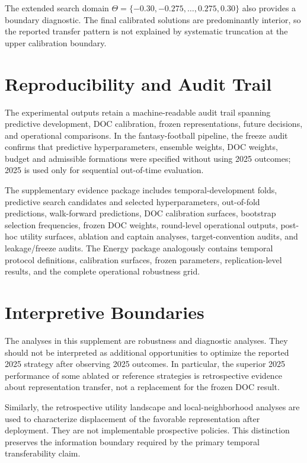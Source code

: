\documentclass[a4paper,fleqn]{cas-sc}
\begin{document}
The extended search domain
$\Theta=\{-0.30,-0.275,\ldots,0.275,0.30\}$
also provides a boundary diagnostic. The final calibrated solutions are
predominantly interior, so the reported transfer pattern is not explained by
systematic truncation at the upper calibration boundary.

\section{Reproducibility and Audit Trail}
\label{sec:supp_repro}

The experimental outputs retain a machine-readable audit trail spanning
predictive development, DOC calibration, frozen representations, future
decisions, and operational comparisons. In the fantasy-football pipeline, the
freeze audit confirms that predictive hyperparameters, ensemble weights, DOC
weights, budget and admissible formations were specified without using 2025
outcomes; 2025 is used only for sequential out-of-time evaluation.

The supplementary evidence package includes temporal-development folds,
predictive search candidates and selected hyperparameters, out-of-fold
predictions, walk-forward predictions, DOC calibration surfaces, bootstrap
selection frequencies, frozen DOC weights, round-level operational outputs,
post-hoc utility surfaces, ablation and captain analyses, target-convention
audits, and leakage/freeze audits. The Energy package analogously contains
temporal protocol definitions, calibration surfaces, frozen parameters,
replication-level results, and the complete operational robustness grid.

\section{Interpretive Boundaries}
\label{sec:supp_boundaries}

The analyses in this supplement are robustness and diagnostic analyses. They
should not be interpreted as additional opportunities to optimize the reported
2025 strategy after observing 2025 outcomes. In particular, the superior 2025
performance of some ablated or reference strategies is retrospective evidence
about representation transfer, not a replacement for the frozen DOC result.

Similarly, the retrospective utility landscape and local-neighborhood analyses
are used to characterize displacement of the favorable representation after
deployment. They are not implementable prospective policies. This distinction
preserves the information boundary required by the primary temporal
transferability claim.
\end{document}
